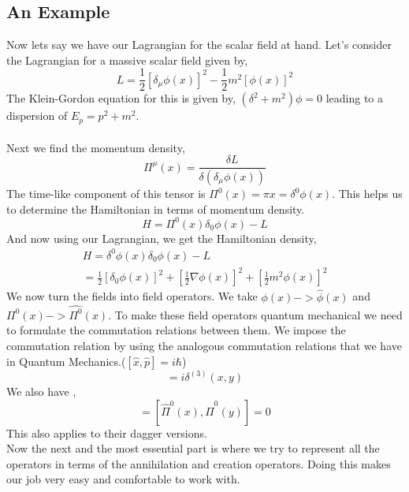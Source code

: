 \subsection{An Example}
Now lets say we have our Lagrangian for the scalar field at hand. Let's consider the Lagrangian for a massive scalar field given by, 
\begin{equation}
    L = \frac{1}{2} [\delta _{\mu} \phi(x) ]^{2} - \frac{1}{2} m^{2} [\phi(x)]^{2}
 \end{equation}
 The Klein-Gordon equation for this is given by,  $(\delta^{2}+m^{2})\phi = 0$ leading to a dispersion of $E_{p} = p^{2} + m^{2}$. \\
 \\
 Next we find the momentum density, 
 \begin{equation}
     \Pi^{\mu} (x) = \frac{\delta L}{\delta (\delta _{\mu} \phi(x))} 
 \end{equation}
 The time-like component of this tensor is $\Pi^{0}(x)= \pi{x}= \delta^{0} \phi(x)$. This helps us to determine the Hamiltonian in terms of momentum density. 
 \begin{equation}
     H = \Pi^{0}(x)\delta_{0}\phi(x) - L
 \end{equation}
 And now using our Lagrangian, we get the Hamiltonian density, 
 \begin{gather}
     H = \delta^{0} \phi(x) \delta_{0}\phi(x) - L  \\
     = \frac{1}{2} [\delta_{0} \phi(x)]^{2} + [\frac{1}{2} \nabla \phi(x)]^{2} +[\frac{1}{2} m^{2}\phi(x)]^{2}
 \end{gather} 
 We now turn the fields into field operators. We take $\phi(x) -> \hat{\phi}(x)$ and $\Pi^{0}(x) -> \hat{\Pi^{0}}(x)$. To make these field operators quantum mechanical we need to formulate the commutation relations between them. We impose the commutation relation by using the analogous commutation relations that we have in Quantum Mechanics.($[\hat{x}, \hat{p}] = i \hbar $)
 \begin{equation}
     [\hat{\phi}(t,x), \hat{\Pi}^{0}(t,y)] = i \delta ^{(3)} (x,y)
 \end{equation} 
 We also have ,
 \begin{equation}
     [\hat{\phi}(x),\hat{\phi}(y) ] = [\hat{\Pi}^{0}(x), \hat{\Pi}^{0}(y)] = 0 
 \end{equation} 
 This also applies to their dagger versions. \\
 Now the next and the most essential part is where we try to represent all the operators in terms of the annihilation and creation operators. Doing this makes our job very easy and comfortable to work with. \\
